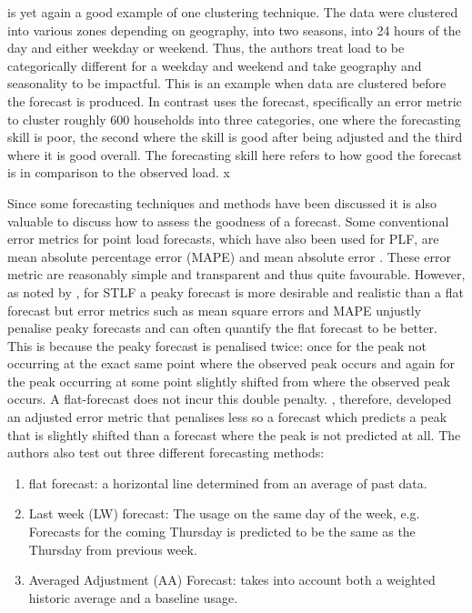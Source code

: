 \citet{char14} is yet again a good example of one clustering technique. The data were clustered into various zones depending on geography, into two seasons, into 24 hours of the day and either weekday or weekend. Thus, the authors treat load to be categorically different for a weekday and weekend and take geography and seasonality to be impactful. This is an example when data are clustered before the forecast is produced. In contrast \cite{dan14} uses the forecast, specifically an error metric to cluster roughly 600 households into three categories, one where the forecasting skill is poor, the second where the skill is good after being adjusted and the third where it is good overall. The forecasting skill here refers to how good the forecast is in comparison to the observed load.
x

Since some forecasting techniques and methods have been discussed it is also valuable to discuss how to assess the goodness of a forecast. Some conventional error metrics for point load forecasts, which have also been used for PLF, are mean absolute percentage error (MAPE) and mean absolute error \citep{hong16}. These error metric are reasonably simple and transparent and thus quite favourable. However, as noted by \cite{dan14}, for STLF a peaky forecast is more desirable and realistic than a flat forecast but error metrics such as mean square errors and MAPE unjustly penalise peaky forecasts and can often quantify the flat forecast to be better. This is because the peaky forecast is penalised twice: once for the peak not occurring at the exact same point where the observed peak occurs and again for the peak occurring at some point slightly shifted from where the observed peak occurs. A flat-forecast does not incur this double penalty. \citet{dan14}, therefore, developed an adjusted error metric that penalises less so a forecast which predicts a peak that is slightly shifted than a forecast where the peak is not predicted at all. The authors also test out three different forecasting methods:
\begin{enumerate}
\item flat forecast: a horizontal line determined from an average of past data.
\item Last week (LW) forecast: The usage on the same day of the week, e.g. Forecasts for the coming Thursday is predicted to be the same as the Thursday from previous week.
\item Averaged Adjustment (AA) Forecast: takes into account both a weighted historic average and a baseline usage.
\end{enumerate}

